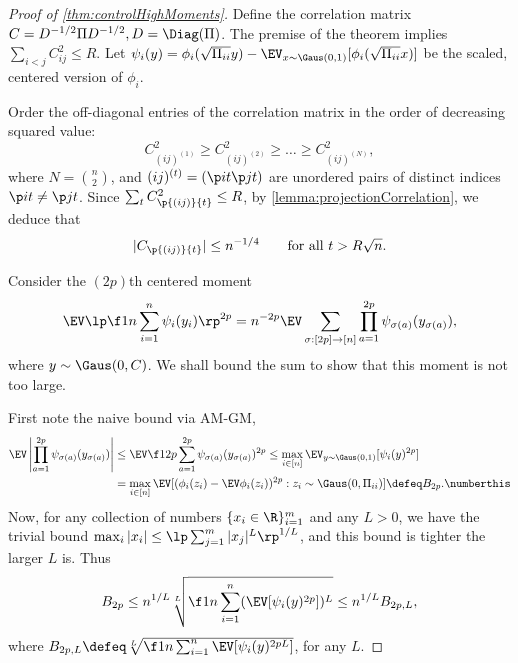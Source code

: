 \documentclass[main.tex]{subfiles}
\begin{document}
\begin{proof}[Proof of \cref{thm:controlHighMoments}]
\newcommand{\Cijt}[3]{C_{\p{(#1 #2)}{#3}}}
Define the correlation matrix $C = D^{-1/2} \Pi D^{-1/2}, D = \Diag(\Pi)$.
The premise of the theorem implies $\sum_{i<j} C_{ij}^2 \le R$.
Let $\psi_i(y) = \phi_i(\sqrt{\Pi_{ii}}y) - \EV_{x \sim \Gaus(0, 1)}[\phi_i(\sqrt{\Pi_{ii}}x)]$ be the scaled, centered version of $\phi_i$.

Order the off-diagonal entries of the correlation matrix in the order of decreasing squared value:
$$C_{(ij)^{(1)}}^2 \ge C_{(ij)^{(2)}}^2 \ge \ldots \ge C_{(ij)^{(N)}}^2,$$
where $N = \binom n 2$, and $(ij)^{(t)} = (\p i t \p j t)$ are unordered pairs of distinct indices $\p i t \ne \p j t$.
Since $\sum_t C_{\p{(ij)}{t}}^2 \le R$, by \cref{lemma:projectionCorrelation}, we deduce that
\begin{equation}
    |\Cijt i j t| \le n^{-1/4} \qquad \text{for all $t > R \sqrt n$}.
    \label{eqn:CijtBound}
\end{equation}

Consider the $(2p)$th centered moment 
\begin{equation*}
\EV \lp \f 1 n \sum_{i=1}^n \psi_i(y_i)\rp^{2p}
= n^{-2p} \EV \sum_{\sigma: [2p] \to [n]} \prod_{a=1}^{2p} \psi_{\sigma(a)}(y_{\sigma(a)}),
\end{equation*}
where $y \sim \Gaus(0, C)$.
We shall bound the sum to show that this moment is not too large.

First note the naive bound via AM-GM,
\begin{align*}
    \EV \left|\prod_{a=1}^{2p} \psi_{\sigma(a)}(y_{\sigma(a)})\right|
    &\le
        \EV \f 1 {2p} \sum_{a=1}^{2p} \psi_{\sigma(a)}(y_{\sigma(a)})^{2p}
    \le
        \max_{i \in [n]} \EV_{y \sim \Gaus(0, 1)}[\psi_i(y)^{2p}]
        \\
    &=
        \max_{i \in [n]} \EV[(\phi_{i}(z_i) - \EV \phi_i(z_i))^{2p}: 
                        z_i \sim \Gaus(0, \Pi_{ii})]
    \defeq
        B_{2p}.
        \numberthis
        \label{eqn:naiveAMGM}
\end{align*}
Now, for any collection of numbers $\{x_i \in \R \}_{i=1}^m$ and any $L > 0$, we have the trivial bound $\max_i |x_i| \le \lp \sum_{j=1}^m |x_j|^L \rp^{1/L}$, and this bound is tighter the larger $L$ is.
Thus
\begin{equation*}
B_{2p} \le n^{1/L} \sqrt[L]{\f 1 n \sum_{i=1}^n (\EV[\psi_i(y)^{2p}])^L} \le n^{1/L} B_{2p,L},
\end{equation*}
where $B_{2p,L} \defeq \sqrt[L]{\f 1 n \sum_{i=1}^n \EV[\psi_i(y)^{2pL}]}$, for any $L$.


\end{proof}
\end{document}
